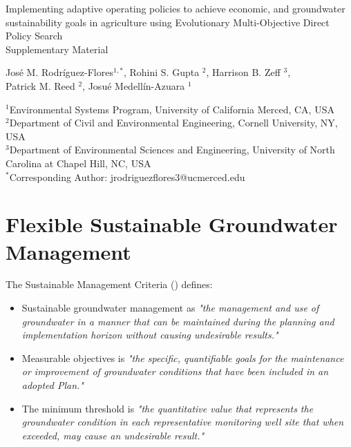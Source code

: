 \documentclass[11pt,a4paper]{article}
\date{}
\begin{document}
\begin{center}
\Large
Implementing adaptive operating policies to achieve economic, and groundwater sustainability goals in agriculture using Evolutionary Multi-Objective Direct Policy Search \\ 
\vspace{0.5cm}
Supplementary Material
\end{center}

\begin{center}
José M. Rodríguez-Flores$^{1,*}$, Rohini S. Gupta $^2$, Harrison B. Zeff $^3$,\\ Patrick M. Reed $^2$, Josué Medellín-Azuara $^1$\\
\end{center}

\begin{center}
\small
$^1$Environmental Systems Program, University of California Merced, CA, USA\\
$^2$Department of Civil and Environmental Engineering, Cornell University, NY, USA\\
$^3$Department of Environmental Sciences and Engineering, University of North Carolina at Chapel Hill, NC, USA\\
$^*$Corresponding Author: jrodriguezflores3@ucmerced.edu
\end{center}

\vspace{0.2cm}

\section{Flexible Sustainable Groundwater Management}

The Sustainable Management Criteria (\cite{dwr_sustainable_2017}) defines:

\begin{itemize}
    \item Sustainable groundwater management as \textit{"the management and use of groundwater in a manner that can be maintained during the planning and implementation horizon without causing undesirable results."}
    \item Measurable objectives is \textit{"the specific, quantifiable goals for the maintenance or improvement of groundwater conditions that have been included in an adopted Plan."}
    \item The minimum threshold is \textit{"the quantitative value that represents the groundwater condition in each representative monitoring well site that when exceeded, may cause an undesirable result."}
\end{itemize}
\end{document}
